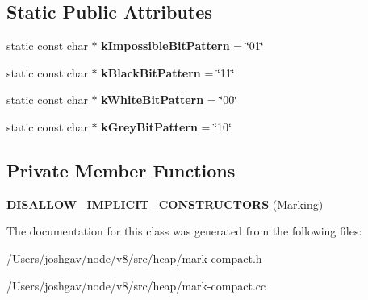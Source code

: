 \subsection*{Static Public Attributes}
\begin{DoxyCompactItemize}
\item 
static const char $\ast$ {\bfseries k\+Impossible\+Bit\+Pattern} = \char`\"{}01\char`\"{}\hypertarget{classv8_1_1internal_1_1_marking_a5d5b84d1f33bf8544a82e61861214335}{}\label{classv8_1_1internal_1_1_marking_a5d5b84d1f33bf8544a82e61861214335}

\item 
static const char $\ast$ {\bfseries k\+Black\+Bit\+Pattern} = \char`\"{}11\char`\"{}\hypertarget{classv8_1_1internal_1_1_marking_ae266eec4e20a094664f5e87e47ed9bb6}{}\label{classv8_1_1internal_1_1_marking_ae266eec4e20a094664f5e87e47ed9bb6}

\item 
static const char $\ast$ {\bfseries k\+White\+Bit\+Pattern} = \char`\"{}00\char`\"{}\hypertarget{classv8_1_1internal_1_1_marking_ae1a2d716903841ec64024f8ccaba6d7a}{}\label{classv8_1_1internal_1_1_marking_ae1a2d716903841ec64024f8ccaba6d7a}

\item 
static const char $\ast$ {\bfseries k\+Grey\+Bit\+Pattern} = \char`\"{}10\char`\"{}\hypertarget{classv8_1_1internal_1_1_marking_a9b85ac4c30060dde97a977e7b6346d55}{}\label{classv8_1_1internal_1_1_marking_a9b85ac4c30060dde97a977e7b6346d55}

\end{DoxyCompactItemize}
\subsection*{Private Member Functions}
\begin{DoxyCompactItemize}
\item 
{\bfseries D\+I\+S\+A\+L\+L\+O\+W\+\_\+\+I\+M\+P\+L\+I\+C\+I\+T\+\_\+\+C\+O\+N\+S\+T\+R\+U\+C\+T\+O\+RS} (\hyperlink{classv8_1_1internal_1_1_marking}{Marking})\hypertarget{classv8_1_1internal_1_1_marking_ae6b3832f3e1d6c6b0ddf604e09e728cb}{}\label{classv8_1_1internal_1_1_marking_ae6b3832f3e1d6c6b0ddf604e09e728cb}

\end{DoxyCompactItemize}


The documentation for this class was generated from the following files\+:\begin{DoxyCompactItemize}
\item 
/\+Users/joshgav/node/v8/src/heap/mark-\/compact.\+h\item 
/\+Users/joshgav/node/v8/src/heap/mark-\/compact.\+cc\end{DoxyCompactItemize}
